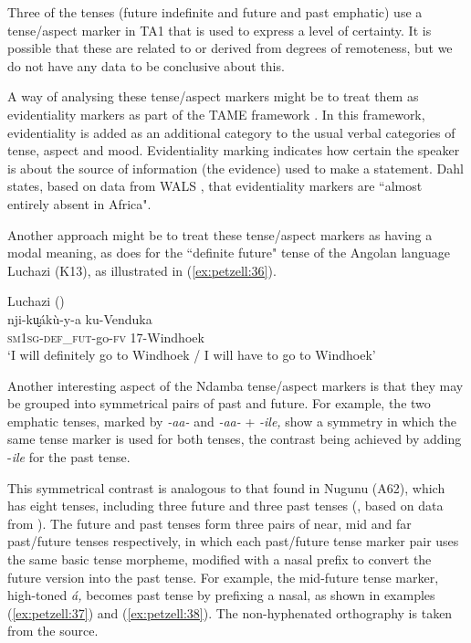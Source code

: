 \documentclass[output=paper,
            colorlinks, citecolor=brown
            ,draftmode
		  ]{langscibook}
\begin{document}
Three of the tenses (future indefinite and future and past emphatic) use a tense/aspect marker in TA1 that is used to express a level of certainty. It is possible that these are related to or derived from degrees of remoteness, but we do not have any data to be conclusive about this.



A way of analysing these tense/aspect markers might be to treat them as evidentiality markers as part of the TAME framework \citep{Dahl2013}. In this framework, evidentiality is added as an additional category to the usual verbal categories of tense, aspect and mood. Evidentiality marking indicates how certain the speaker is about the source of information (the evidence) used to make a statement. Dahl states, based on data from WALS \citep{deHaan2013}, that evidentiality markers are ``almost entirely absent in Africa".



Another approach might be to treat these tense/aspect markers as having a modal meaning, as does \citet{Fleisch2000} for the “definite future" tense of the Angolan language Luchazi (K13), as illustrated in  (\ref{ex:petzell:36}).

\newpage
\ea\label{ex:petzell:36}Luchazi (\citealt[150]{Fleisch2000})\\
\gll nji-ku̬ákù-y-a          ku-Venduka \\
\textsc{sm}1\textsc{sg}{}-\textsc{def}\_\textsc{fut}{}-go-\textsc{fv}    17-Windhoek\\
\glt `I will definitely go to Windhoek / I will have to go to Windhoek'
\z


Another interesting aspect of the Ndamba tense/aspect markers is that they may be grouped into symmetrical pairs of past and future. For example, the two emphatic tenses, marked by \textit{{}-aa-} and \textit{\nobreakdash-aa-} + \textit{{}-ile,} show a symmetry in which the same tense marker is used for both tenses, the contrast being achieved by adding -\textit{ile} for the past tense.



This symmetrical contrast is analogous to that found in Nugunu (A62), which has eight tenses, including three future and three past tenses (\citealt[161]{BotneKershner2008}, based on data from \citealt{Gerhardt1989}). The future and past tenses form three pairs of near, mid and far past/future tenses respectively, in which each past/future tense marker pair uses the same basic tense morpheme, modified with a nasal prefix to convert the future version into the past tense. For example, the mid-future tense marker, high-toned \textit{á,} becomes past tense by prefixing a nasal, as shown in examples (\ref{ex:petzell:37}) and (\ref{ex:petzell:38}). The non-hyphenated orthography is taken from the source.
\end{document}
